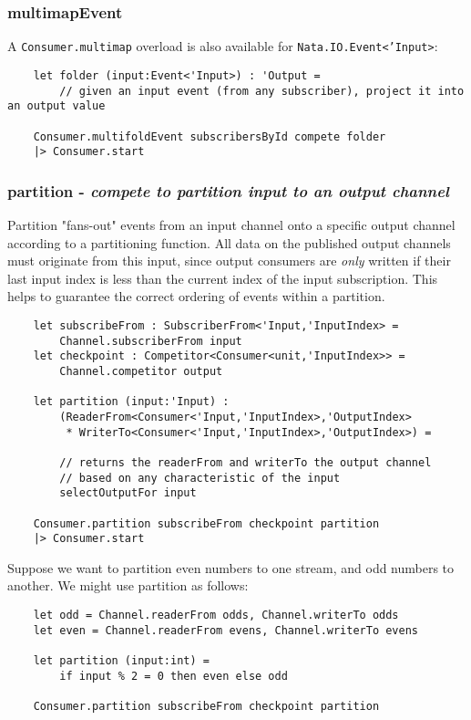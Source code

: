 \documentclass{article}
\begin{document}
\subsubsection{multimapEvent}

A \texttt{Consumer.multimap} overload is also available for \texttt{Nata.IO.Event<'Input>}:

\begin{verbatim}
    let folder (input:Event<'Input>) : 'Output =
        // given an input event (from any subscriber), project it into an output value

    Consumer.multifoldEvent subscribersById compete folder
    |> Consumer.start
\end{verbatim}

\subsubsection{partition - \textit{compete to partition input to an output channel}}

Partition "fans-out" events from an input channel onto a specific output channel according to a partitioning function.  All data on the published output channels must originate from this input, since output consumers are \textit{only} written if their last input index is less than the current index of the input subscription.  This helps to guarantee the correct ordering of events within a partition.

\begin{verbatim}
    let subscribeFrom : SubscriberFrom<'Input,'InputIndex> =
        Channel.subscriberFrom input
    let checkpoint : Competitor<Consumer<unit,'InputIndex>> =
        Channel.competitor output
    
    let partition (input:'Input) :
        (ReaderFrom<Consumer<'Input,'InputIndex>,'OutputIndex>
         * WriterTo<Consumer<'Input,'InputIndex>,'OutputIndex>) =
        
        // returns the readerFrom and writerTo the output channel
        // based on any characteristic of the input
        selectOutputFor input
        
    Consumer.partition subscribeFrom checkpoint partition
    |> Consumer.start
\end{verbatim}

Suppose we want to partition even numbers to one stream, and odd numbers to another.  We might use partition as follows:

\begin{verbatim}
    let odd = Channel.readerFrom odds, Channel.writerTo odds
    let even = Channel.readerFrom evens, Channel.writerTo evens
        
    let partition (input:int) =
        if input % 2 = 0 then even else odd
        
    Consumer.partition subscribeFrom checkpoint partition
\end{verbatim}
\end{document}
